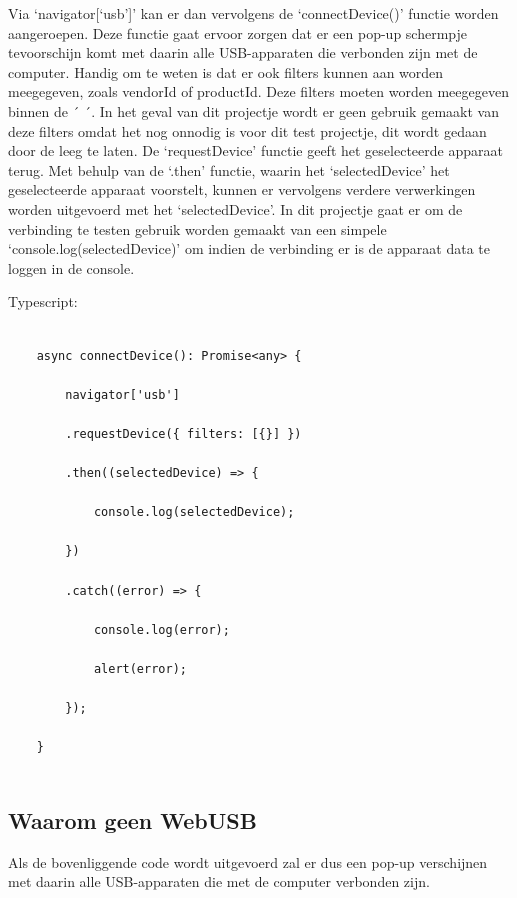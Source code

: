 Via ‘navigator[‘usb’]’ kan er dan vervolgens de ‘connectDevice()’ functie worden aangeroepen. Deze functie gaat ervoor zorgen dat er een pop-up schermpje tevoorschijn komt met daarin alle USB-apparaten die verbonden zijn met de computer. Handig om te weten is dat er ook filters kunnen aan worden meegegeven, zoals vendorId of productId. Deze filters moeten worden meegegeven binnen de ´{ }´. In het geval van dit projectje wordt er geen gebruik gemaakt van deze filters omdat het nog onnodig is voor dit test projectje, dit wordt gedaan door de { } leeg te laten. De ‘requestDevice’ functie geeft het geselecteerde apparaat terug. Met behulp van de ‘.then’ functie, waarin het ‘selectedDevice’ het geselecteerde apparaat voorstelt, kunnen er vervolgens verdere verwerkingen worden uitgevoerd met het ‘selectedDevice’. In dit projectje gaat er om de verbinding te testen gebruik worden gemaakt van een simpele ‘console.log(selectedDevice)’ om indien de verbinding er is de apparaat data te loggen in de console. 

Typescript: 
\begin{verbatim} 
    
    async connectDevice(): Promise<any> { 
        
        navigator['usb'] 
        
        .requestDevice({ filters: [{}] }) 
        
        .then((selectedDevice) => { 
            
            console.log(selectedDevice); 
            
        }) 
        
        .catch((error) => { 
            
            console.log(error); 
            
            alert(error); 
            
        }); 
        
    } 
    
\end{verbatim} 

\subsection{Waarom geen WebUSB}
Als de bovenliggende code wordt uitgevoerd zal er dus een pop-up verschijnen met daarin alle USB-apparaten die met de computer verbonden zijn.

